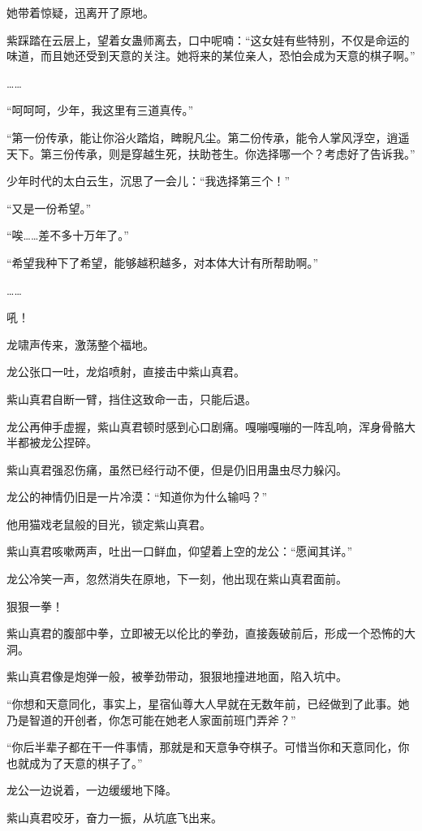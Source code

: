 \begin{this_body}
她带着惊疑，迅离开了原地。

紫踩踏在云层上，望着女蛊师离去，口中呢喃：“这女娃有些特别，不仅是命运的味道，而且她还受到天意的关注。她将来的某位亲人，恐怕会成为天意的棋子啊。”

……

“呵呵呵，少年，我这里有三道真传。”

“第一份传承，能让你浴火踏焰，睥睨凡尘。第二份传承，能令人掌风浮空，逍遥天下。第三份传承，则是穿越生死，扶助苍生。你选择哪一个？考虑好了告诉我。”

少年时代的太白云生，沉思了一会儿：“我选择第三个！”

“又是一份希望。”

“唉……差不多十万年了。”

“希望我种下了希望，能够越积越多，对本体大计有所帮助啊。”

……

吼！

龙啸声传来，激荡整个福地。

龙公张口一吐，龙焰喷射，直接击中紫山真君。

紫山真君自断一臂，挡住这致命一击，只能后退。

龙公再伸手虚握，紫山真君顿时感到心口剧痛。嘎嘣嘎嘣的一阵乱响，浑身骨骼大半都被龙公捏碎。

紫山真君强忍伤痛，虽然已经行动不便，但是仍旧用蛊虫尽力躲闪。

龙公的神情仍旧是一片冷漠：“知道你为什么输吗？”

他用猫戏老鼠般的目光，锁定紫山真君。

紫山真君咳嗽两声，吐出一口鲜血，仰望着上空的龙公：“愿闻其详。”

龙公冷笑一声，忽然消失在原地，下一刻，他出现在紫山真君面前。

狠狠一拳！

紫山真君的腹部中拳，立即被无以伦比的拳劲，直接轰破前后，形成一个恐怖的大洞。

紫山真君像是炮弹一般，被拳劲带动，狠狠地撞进地面，陷入坑中。

“你想和天意同化，事实上，星宿仙尊大人早就在无数年前，已经做到了此事。她乃是智道的开创者，你怎可能在她老人家面前班门弄斧？”

“你后半辈子都在干一件事情，那就是和天意争夺棋子。可惜当你和天意同化，你也就成为了天意的棋子了。”

龙公一边说着，一边缓缓地下降。

紫山真君咬牙，奋力一振，从坑底飞出来。


\end{this_body}
